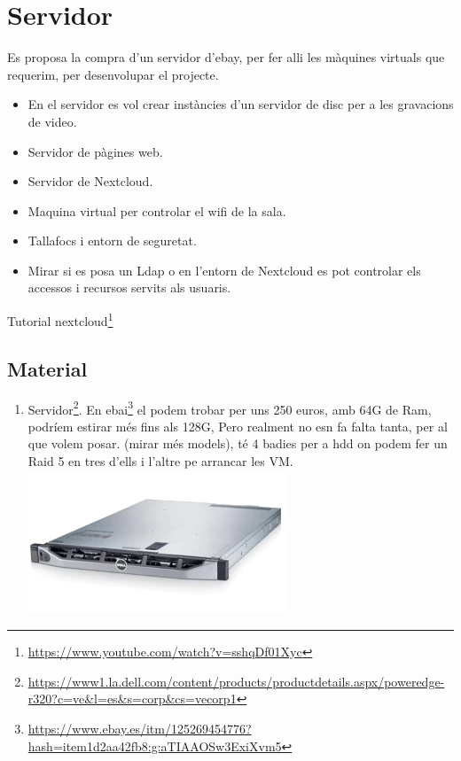 \documentclass[
  10pt,
]{krantz}
\DeclareRobustCommand{\href}[2]{#2\footnote{\url{#1}}}
\providecommand{\tightlist}{%
  \setlength{\itemsep}{0pt}\setlength{\parskip}{0pt}}
\begin{document}
\hypertarget{servidor-1}{%
\chapter{Servidor}\label{servidor-1}}

Es proposa la compra d'un servidor d'ebay, per fer alli les màquines virtuals que requerim, per desenvolupar el projecte.

\begin{itemize}
\item
  En el servidor es vol crear instàncies d'un servidor de disc per a les gravacions de video.
\item
  Servidor de pàgines web.
\item
  Servidor de Nextcloud.
\item
  Maquina virtual per controlar el wifi de la sala.
\item
  Tallafocs i entorn de seguretat.
\item
  Mirar si es posa un Ldap o en l'entorn de Nextcloud es pot controlar els accessos i recursos servits als usuaris.
\end{itemize}

Tutorial \href{https://www.youtube.com/watch?v=sshqDf01Xyc}{nextcloud}

\hypertarget{material}{%
\section{Material}\label{material}}

\begin{enumerate}
\def\labelenumi{\arabic{enumi}.}
\tightlist
\item
  \href{https://www1.la.dell.com/content/products/productdetails.aspx/poweredge-r320?c=ve\&l=es\&s=corp\&cs=vecorp1}{Servidor}. En \href{https://www.ebay.es/itm/125269454776?hash=item1d2aa42fb8:g:aTIAAOSw3ExiXvm5}{ebai} el podem trobar per uns 250 euros, amb 64G de Ram, podríem estirar més fins als 128G, Pero realment no esn fa falta tanta, per al que volem posar. (mirar més models), té 4 badies per a hdd on podem fer un Raid 5 en tres d'ells i l'altre pe arrancar les VM. \includegraphics{imatges/serverR320.png}
\end{enumerate}
\end{document}
